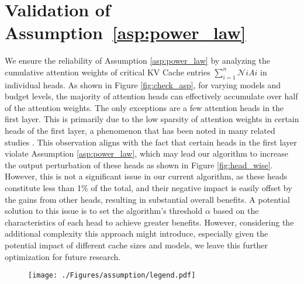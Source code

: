 
\newpage

\appendix

{
\section{Validation of Assumption~\ref{asp:power_law}}
\label{apdx:check_asp}
We ensure the reliability of Assumption \ref{asp:power_law} by analyzing the cumulative attention weights of critical KV Cache entries $\sum\nolimits_{i=1}^{n} \mathcal{N}i A{i}$ in individual heads. As shown in Figure \ref{fig:check_asp}, for varying models and budget levels, the majority of attention heads can effectively accumulate over half of the attention weights. The only exceptions are a few attention heads in the first layer. This is primarily due to the low sparsity of attention weights in certain heads of the first layer, a phenomenon that has been noted in many related studies \cite{quest,h2o,pyramidkv}. This observation aligns with the fact that certain heads in the first layer violate Assumption \ref{asp:power_law}, which may lead our algorithm to increase the output perturbation of these heads as shown in Figure \ref{fig:head_wise}.  
However, this is not a significant issue in our current algorithm, as these heads constitute less than 1\% of the total, and their negative impact is easily offset by the gains from other heads, resulting in substantial overall benefits. A potential solution to this issue is to set the algorithm's threshold $\alpha$ based on the characteristics of each head to achieve greater benefits. However, considering the additional complexity this approach might introduce, especially given the potential impact of different cache sizes and models, we leave this further optimization for future research.




\begin{figure}[t]
	\centering
	\texttt{[image: ./Figures/assumption/legend.pdf]}
	\hspace{-0.1cm}


\end{figure}}
